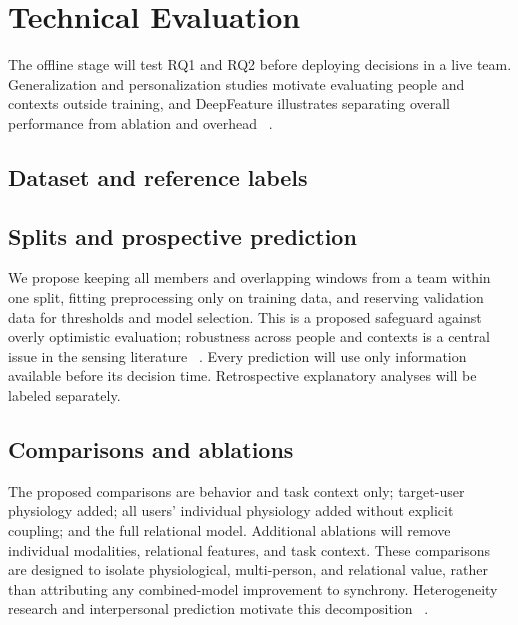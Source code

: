 \section{Technical Evaluation}
\label{sec:7}

The offline stage will test RQ1 and RQ2 before deploying decisions in a live team. Generalization and personalization studies motivate evaluating people and contexts outside training, and DeepFeature illustrates separating overall performance from ablation and overhead ~\cite{hhiss,crop,deep}.

\subsection{Dataset and reference labels}


\subsection{Splits and prospective prediction}

We propose keeping all members and overlapping windows from a team within one split, fitting preprocessing only on training data, and reserving validation data for thresholds and model selection. This is a proposed safeguard against overly optimistic evaluation; robustness across people and contexts is a central issue in the sensing literature ~\cite{hhiss,crop}. Every prediction will use only information available before its decision time. Retrospective explanatory analyses will be labeled separately.


\subsection{Comparisons and ablations}

The proposed comparisons are behavior and task context only; target-user physiology added; all users' individual physiology added without explicit coupling; and the full relational model. Additional ablations will remove individual modalities, relational features, and task context. These comparisons are designed to isolate physiological, multi-person, and relational value, rather than attributing any combined-model improvement to synchrony. Heterogeneity research and interpersonal prediction motivate this decomposition ~\cite{hhiss,p52}.

